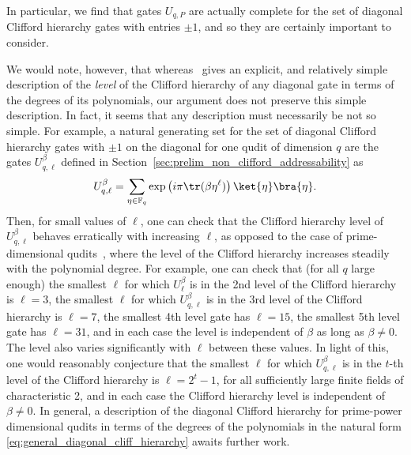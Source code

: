 \documentclass[11pt]{article}
\theoremstyle{definition}
\begin{document}
In particular, we find that gates $U_{q,P}$ are actually complete for the set of diagonal Clifford hierarchy gates with entries $\pm 1$, and so they are certainly important to consider.

We would note, however, that whereas~\cite{cui2017diagonal} gives an explicit, and relatively simple description of the \textit{level} of the Clifford hierarchy of any diagonal gate in terms of the degrees of its polynomials, our argument does not preserve this simple description. In fact, it seems that any description must necessarily be not so simple. For example, a natural generating set for the set of diagonal Clifford hierarchy gates with $\pm 1$ on the diagonal for one qudit of dimension $q$ are the gates $U_{q,\ell}^\beta$ defined in Section~\ref{sec:prelim_non_clifford_addressability} as
\begin{equation}
    U_{q,\ell}^\beta = \sum_{\eta \in \mathbb{F}_q}\exp\left(i\pi\tr(\beta\eta^\ell)\right)\ket{\eta}\bra{\eta}.
\end{equation}
Then, for small values of $\ell$, one can check that the Clifford hierarchy level of $U_{q,\ell}^\beta$ behaves erratically with increasing $\ell$, as opposed to the case of prime-dimensional qudits~\cite{cui2017diagonal}, where the level of the Clifford hierarchy increases steadily with the polynomial degree. For example, one can check that (for all $q$ large enough) the smallest $\ell$ for which $U_\ell^\beta$ is in the 2nd level of the Clifford hierarchy is $\ell = 3$, the smallest $\ell$ for which $U_{q,\ell}^\beta$ is in the 3rd level of the Clifford hierarchy is $\ell=7$, the smallest 4th level gate has $\ell=15$, the smallest 5th level gate has $\ell=31$, and in each case the level is independent of $\beta$ as long as $\beta \neq 0$. The level also varies significantly with $\ell$ between these values. In light of this, one would reasonably conjecture that the smallest $\ell$ for which $U_{q,\ell}^\beta$ is in the $t$-th level of the Clifford hierarchy is $\ell = 2^t-1$, for all sufficiently large finite fields of characteristic 2, and in each case the Clifford hierarchy level is independent of $\beta \neq 0$. In general, a description of the diagonal Clifford hierarchy for prime-power dimensional qudits in terms of the degrees of the polynomials in the natural form \eqref{eq:general_diagonal_cliff_hierarchy} awaits further work. 
\end{document}
